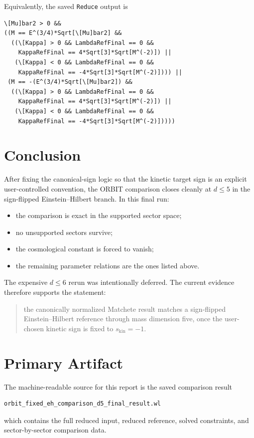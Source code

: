 \documentclass[11pt]{article}
\begin{document}
Equivalently, the saved \texttt{Reduce} output is
\begin{verbatim}
\[Mu]bar2 > 0 &&
((M == E^(3/4)*Sqrt[\[Mu]bar2] &&
  ((\[Kappa] > 0 && LambdaRefFinal == 0 &&
    KappaRefFinal == 4*Sqrt[3]*Sqrt[M^(-2)]) ||
   (\[Kappa] < 0 && LambdaRefFinal == 0 &&
    KappaRefFinal == -4*Sqrt[3]*Sqrt[M^(-2)]))) ||
 (M == -(E^(3/4)*Sqrt[\[Mu]bar2]) &&
  ((\[Kappa] > 0 && LambdaRefFinal == 0 &&
    KappaRefFinal == 4*Sqrt[3]*Sqrt[M^(-2)]) ||
   (\[Kappa] < 0 && LambdaRefFinal == 0 &&
    KappaRefFinal == -4*Sqrt[3]*Sqrt[M^(-2)]))))
\end{verbatim}

\section{Conclusion}
After fixing the canonical-sign logic so that the kinetic target sign is an explicit user-controlled convention, the ORBIT comparison closes cleanly at \(d \le 5\) in the sign-flipped Einstein--Hilbert branch. In this final run:
\begin{itemize}
\item the comparison is exact in the supported sector space;
\item no unsupported sectors survive;
\item the cosmological constant is forced to vanish;
\item the remaining parameter relations are the ones listed above.
\end{itemize}

The expensive \(d \le 6\) rerun was intentionally deferred. The current evidence therefore supports the statement:
\begin{quote}
the canonically normalized Matchete result matches a sign-flipped Einstein--Hilbert reference through mass dimension five, once the user-chosen kinetic sign is fixed to \(s_{\mathrm{kin}}=-1\).
\end{quote}

\section{Primary Artifact}
The machine-readable source for this report is the saved comparison result
\begin{verbatim}
orbit_fixed_eh_comparison_d5_final_result.wl
\end{verbatim}
which contains the full reduced input, reduced reference, solved constraints, and sector-by-sector comparison data.
\end{document}
